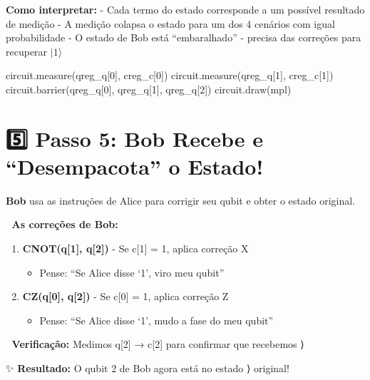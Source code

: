 \documentclass[
  brazilian,
]{report}
\newenvironment{Shaded}{\begin{snugshade}}{\end{snugshade}}
\newcommand{\NormalTok}[1]{\textcolor[rgb]{0.00,0.23,0.31}{#1}}
\providecommand{\tightlist}{%
  \setlength{\itemsep}{0pt}\setlength{\parskip}{0pt}}
\begin{document}
\textbf{Como interpretar:} - Cada termo do estado corresponde a um
possível resultado de medição - A medição colapsa o estado para um dos 4
cenários com igual probabilidade - O estado de Bob está ``embaralhado''
- precisa das correções para recuperar \(|1\rangle\)

\begin{Shaded}
\begin{Highlighting}[]

\NormalTok{circuit.measure(qreg\_q[0], creg\_c[0])}
\NormalTok{circuit.measure(qreg\_q[1], creg\_c[1])}
\NormalTok{circuit.barrier(qreg\_q[0], qreg\_q[1], qreg\_q[2])}
\NormalTok{circuit.draw(\textquotesingle{}mpl\textquotesingle{})}
\end{Highlighting}
\end{Shaded}

\section{5️⃣ Passo 5: Bob Recebe e ``Desempacota'' o
Estado!}\label{passo-5-bob-recebe-e-desempacota-o-estado}

\textbf{Bob} usa as instruções de Alice para corrigir seu qubit e obter
o estado original.

🔧 \textbf{As correções de Bob:}

\begin{enumerate}
\def\labelenumi{\arabic{enumi}.}
\tightlist
\item
  \textbf{CNOT(q{[}1{]}, q{[}2{]})} - Se c{[}1{]} = 1, aplica correção X

  \begin{itemize}
  \tightlist
  \item
    Pense: ``Se Alice disse `1', viro meu qubit''
  \end{itemize}
\item
  \textbf{CZ(q{[}0{]}, q{[}2{]})} - Se c{[}0{]} = 1, aplica correção Z

  \begin{itemize}
  \tightlist
  \item
    Pense: ``Se Alice disse `1', mudo a fase do meu qubit''
  \end{itemize}
\end{enumerate}

🎯 \textbf{Verificação:} Medimos q{[}2{]} → c{[}2{]} para confirmar que
recebemos ⟩

✨ \textbf{Resultado:} O qubit 2 de Bob agora está no estado ⟩
original!
\end{document}
